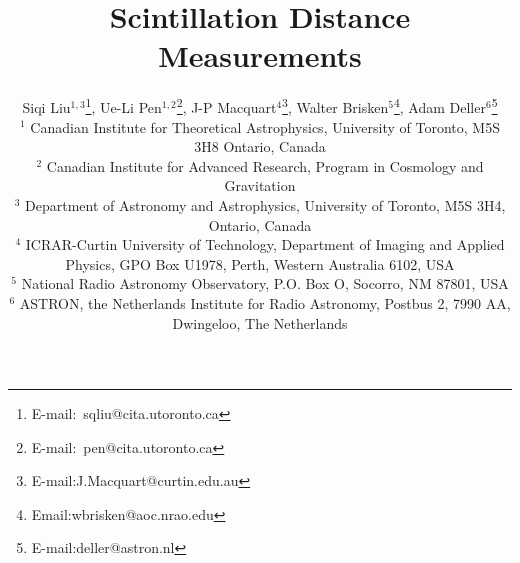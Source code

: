\documentclass[useAMS,usenatbib]{mn2e}
\begin{document}
\title[Lensing Distance]{
Scintillation Distance Measurements
}


\author[Liu et al]{Siqi Liu$^{1,3}$\thanks{E-mail:\ sqliu@cita.utoronto.ca}, Ue-Li
  Pen$^{1,2}$\thanks{E-mail:\ pen@cita.utoronto.ca}, J-P Macquart$^{4}$\thanks{E-mail:J.Macquart@curtin.edu.au},
  Walter Brisken$^{5}$\thanks{Email:wbrisken@aoc.nrao.edu}, Adam Deller$^{6}$\thanks{E-mail:deller@astron.nl}\\
 $^1$ Canadian Institute for Theoretical Astrophysics, University of Toronto, M5S 3H8 Ontario, Canada \\
$^2$ Canadian Institute for Advanced Research, Program in Cosmology
and Gravitation\\
$^3$ Department of Astronomy and Astrophysics, University of Toronto, M5S 3H4, Ontario, Canada\\
$^4$ ICRAR-Curtin University of Technology, Department of Imaging and Applied Physics, GPO Box U1978, Perth, Western Australia 6102, USA \\
$^5$ National Radio Astronomy Observatory, P.O. Box O, Socorro, NM 87801, USA\\
$^6$ ASTRON, the Netherlands Institute for Radio Astronomy, Postbus 2, 7990 AA, Dwingeloo, The Netherlands\\
}
\end{document}
